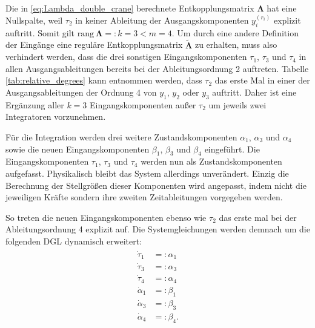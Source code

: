 Die in \eqref{eq:Lambda_double_crane} berechnete Entkopplungsmatrix $\boldsymbol{\Lambda}$ hat eine Nullspalte, weil $\tau_2$ in keiner Ableitung der Ausgangskomponenten $y_i^{(r_i)}$ explizit auftritt. Somit gilt ${\text{rang} \ \boldsymbol{\Lambda} =: k = 3 < m = 4}$. Um durch eine andere Definition der Eingänge eine reguläre Entkopplungsmatrix $\tilde{\boldsymbol{\Lambda}}$ zu erhalten, muss also verhindert werden, dass die drei sonstigen Eingangskomponenten $\tau_1$, $\tau_3$ und $\tau_4$ in allen Ausgangsableitungen bereits bei der Ableitungsordnung 2 auftreten. Tabelle \ref{tab:relative_degrees} kann entnommen werden, dass $\tau_{2}$ das erste Mal in einer der Ausgangsableitungen der Ordnung 4 von $y_1$, $y_2$ oder $y_3$ auftritt. Daher ist eine Ergänzung aller $k = 3$ Eingangskomponenten außer $\tau_2$ um jeweils zwei Integratoren vorzunehmen. \cite[S. 200]{NLRT_Roebenack} 

Für die Integration werden drei weitere Zustandskomponenten $\alpha_1$, $\alpha_3$ und $\alpha_4$ sowie die neuen Eingangskomponenten $\beta_1$, $\beta_3$ und $\beta_4$ eingeführt. Die Eingangskomponenten $\tau_1$, $\tau_3$ und $\tau_4$ werden nun als Zustandskomponenten aufgefasst. Physikalisch bleibt das System allerdings unverändert. Einzig die Berechnung der Stellgrößen dieser Komponenten wird angepasst, indem nicht die jeweiligen Kräfte sondern ihre zweiten Zeitableitungen vorgegeben werden.

So treten die neuen Eingangskomponenten ebenso wie $\tau_2$ das erste mal bei der Ableitungsordnung 4 explizit auf. Die Systemgleichungen werden demnach um die folgenden DGL dynamisch erweitert:
\begin{align}
	\begin{split}
		\dot{\tau}_1 &=: \alpha_1 \\
		\dot{\tau}_3 &=: \alpha_3 \\
		\dot{\tau}_4 &=: \alpha_4 \\
		\dot{\alpha}_1 &=: \beta_1 \\
		\dot{\alpha}_3 &=: \beta_3 \\
		\dot{\alpha}_4 &=: \beta_4 .
	\end{split}
\end{align}

